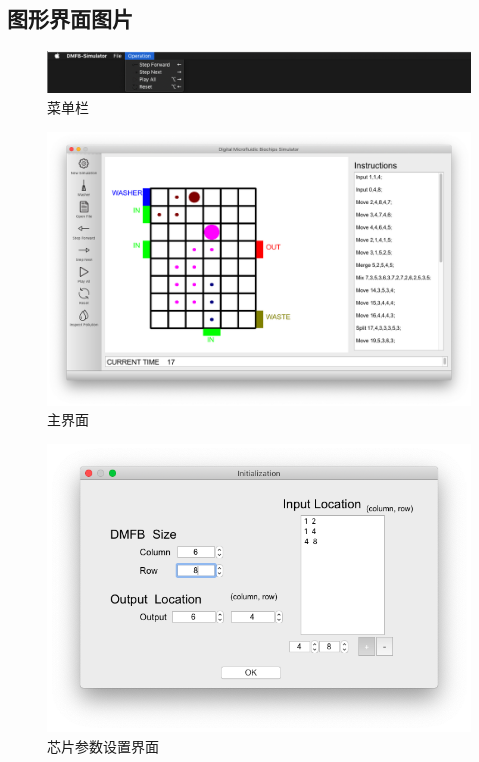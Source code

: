 \documentclass[12pt, a4paper]{article}
\begin{document}
		
		\newpage
		\begin{appendices}
			\section{图形界面图片}
			
			\begin{figure}[htbp]
				\centering
				\includegraphics[width=15cm]{Img/menu.png}
				\caption{菜单栏}
			\end{figure}
		
			\begin{figure}[htbp]
				\centering
				\includegraphics[width=15cm]{Img/main.png}
				\caption{主界面}
			\end{figure}
		
			\begin{figure}[htbp]
				\centering
				\includegraphics[width=15cm]{Img/init.png}
				\caption{芯片参数设置界面}
			\end{figure}
		

\end{appendices}
\end{document}
